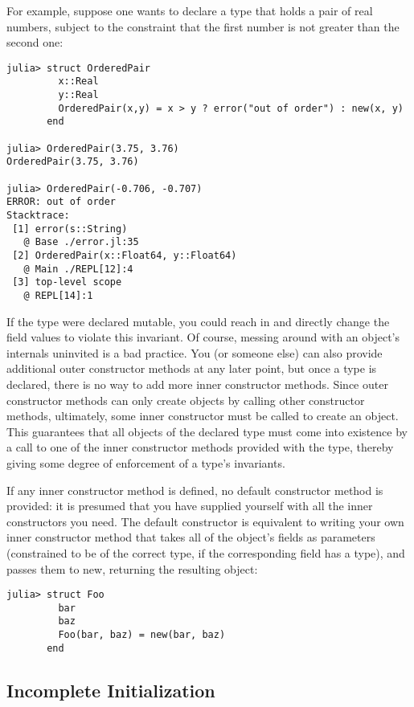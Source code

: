 \documentclass[
]{article}
\begin{document}
For example, suppose one wants to declare a type that holds a pair of
real numbers, subject to the constraint that the first number is not
greater than the second one:

\begin{verbatim}
julia> struct OrderedPair
         x::Real
         y::Real
         OrderedPair(x,y) = x > y ? error("out of order") : new(x, y)
       end

julia> OrderedPair(3.75, 3.76)
OrderedPair(3.75, 3.76)

julia> OrderedPair(-0.706, -0.707)
ERROR: out of order
Stacktrace:
 [1] error(s::String)
   @ Base ./error.jl:35
 [2] OrderedPair(x::Float64, y::Float64)
   @ Main ./REPL[12]:4
 [3] top-level scope
   @ REPL[14]:1
\end{verbatim}

If the type were declared mutable, you could reach in and directly
change the field values to violate this invariant. Of course, messing
around with an object's internals uninvited is a bad practice. You (or
someone else) can also provide additional outer constructor methods at
any later point, but once a type is declared, there is no way to add
more inner constructor methods. Since outer constructor methods can only
create objects by calling other constructor methods, ultimately, some
inner constructor must be called to create an object. This guarantees
that all objects of the declared type must come into existence by a call
to one of the inner constructor methods provided with the type, thereby
giving some degree of enforcement of a type's invariants.

If any inner constructor method is defined, no default constructor
method is provided: it is presumed that you have supplied yourself with
all the inner constructors you need. The default constructor is
equivalent to writing your own inner constructor method that takes all
of the object's fields as parameters (constrained to be of the correct
type, if the corresponding field has a type), and passes them to new,
returning the resulting object:

\begin{verbatim}
julia> struct Foo
         bar
         baz
         Foo(bar, baz) = new(bar, baz)
       end
\end{verbatim}

\hypertarget{incomplete-initialization}{%
\subsection{Incomplete Initialization}\label{incomplete-initialization}}
\end{document}
